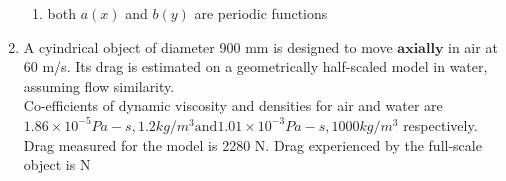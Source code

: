 \documentclass[journal]{IEEEtran}
\begin{document}
\begin{enumerate}
\begin{enumerate}
			\item both $a(x)$ and $b(y)$ are periodic functions
		\end{enumerate}
	\item A cyindrical object of diameter 900 mm is designed to move $\textbf{axially}$ in air at 60 m/s. Its drag is estimated on a geometrically half-scaled model in water, assuming flow similarity. \\
		Co-efficients of dynamic viscosity and densities for air and water are $1.86 \times 10^{-5} Pa-s, 1.2 kg/m^3 \text{and} 1.01 \times 10^{-3} Pa-s, 1000 kg/m^3$ respectively. \\
		Drag measured for the model is 2280 N. Drag experienced by the full-scale object is \underline{  } N
		\begin{enumerate}
		\end{enumerate}
\end{enumerate}
\end{document}
